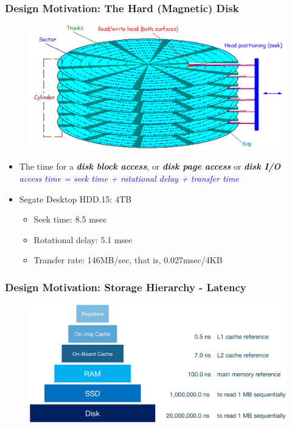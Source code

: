 \begin{frame}[fragile]
	\frametitle{Design Motivation: The Hard (Magnetic) Disk}
	\begin{figure}
		\includegraphics[width=0.5\linewidth]{figs/dbfile-harddisk.png}
	\end{figure}
	\begin{itemize}
		\pause
		\item The time for a \textbf{\emph{disk block access}}, or \textbf{\emph{disk page access}} or 
		\textbf{\emph{disk I/O}}
\\
		\emph{\textcolor{blue}{access time {\rm =} seek time {\rm +} rotational delay {\rm +} transfer time}}
		\pause
		\item Segate Desktop HDD.15: 4TB
		\begin{itemize}
			\item Seek time: 8.5 msec
			\item Rotational delay: 5.1 msec
			\item Transfer rate: 146MB/sec, that is, 0.027msec/4KB
		\end{itemize}
	\end{itemize}
\end{frame}

\begin{frame}[fragile]
	\frametitle{Design Motivation: Storage Hierarchy - Latency}
	\begin{figure}
		\includegraphics[width=0.85\linewidth]{figs/dbfile-latency1.pdf}
	\end{figure}
\end{frame}

